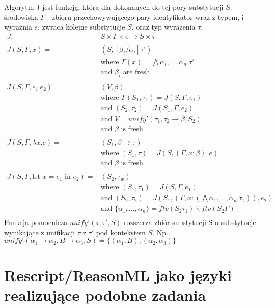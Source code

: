 \documentclass{article}
\begin{document}
Algorytm J jest funkcją, która dla dokonanych do tej pory substytucji $S$, środowiska $\Gamma$ - zbioru przechowywującego pary identyfikator wraz z typem, i wyrażnia $e$, zwraca kolejne substytucje $S$, oraz typ wyrażenia $\tau$.
\begin{equation}
  \begin{split}
    J :& S\times\Gamma\times e \rightarrow S\times\tau \\
    \\
    J(S,\Gamma,x) =& (S,[\beta_i/\alpha_i]\tau') \\
    &\text{where } \Gamma(x) = \bigwedge\alpha_i,...,\alpha_n.\tau' \\
    &\text{and } \beta_i \text{ are fresh} \\
    \\
    J(S,\Gamma,e_1\ e_2) =& (V,\beta) \\
    &\text{where } \Gamma(S_1,\tau_1) = J(S,\Gamma,e_1) \\
    &\text{and } (S_2,\tau_2)=J(S_1,\Gamma,e_2) \\
    &\text{and } V = unify'(\tau_1,\tau_2\rightarrow\beta,S_2) \\
    &\text{and } \beta \text{ is fresh} \\
    \\
    J(S,\Gamma,\lambda x.e) =& (S_1,\beta\rightarrow\tau) \\
    &\text{where } (S_1,\tau)=J(S,(\Gamma,x:\beta),e) \\
    &\text{and } \beta \text{ is fresh} \\
    \\
    J(S,\Gamma,\text{let }x=e_1\text{ in }e_2) =& (S_2,\tau_w) \\
    &\text{where } (S_1,\tau_1)=J(S,\Gamma,e_1) \\
    &\text{and } (S_2,\tau_2)=J(S_1,(\Gamma,x:(\bigwedge\alpha_1,...,\alpha_n.\tau_1)),e_2) \\
    &\text{and } \{\alpha_1,...,\alpha_n\}=ftv(S_2\tau_1)\backslash ftv(S_2\Gamma) \\
  \end{split}
\end{equation}
Funkcja pomocnicza $unify'(\tau,\tau',S)$ rozszerza zbiór substytucji S o substytucje wynikające z unifikacji $\tau$ z $\tau'$ pod kontekstem $S$. Np. $unify'(\alpha_1\rightarrow\alpha_2,B\rightarrow\alpha_3,S) = \{(\alpha_1,B), (\alpha_2,\alpha_3)\}$


\section{Rescript/ReasonML jako języki realizujące podobne zadania}
\end{document}
